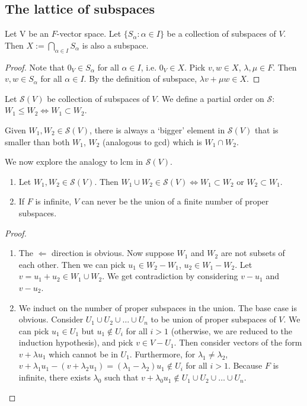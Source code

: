 \documentclass{scrartcl}
\def\le{\leqslant}
\begin{document}
\subsection{The lattice of subspaces}
\begin{proposition}
	Let V be an $F$-vector space. Let $\{S_\alpha: \alpha \in I\}$ be a collection of subspaces of $V$. Then $X := \bigcap_{\alpha \in I}S_\alpha$ is also a subspace.
\end{proposition}
\begin{proof}
	Note that $0_V \in S_\alpha$ for all $\alpha \in I$, i.e. $0_V \in X$. 
	Pick $v, w \in X$, $\lambda, \mu \in F$. Then $v, w \in S_\alpha$ for all $\alpha \in I$. By the definition of subspace, $\lambda v + \mu w \in X$. 
\end{proof}
Let $\mathcal{S}(V)$ be collection of subspaces of $V$. We define a partial order on $\mathcal{S}$: $W_1 \le W_2 \iff W_1 \subset W_2$. 
\begin{remark}
	Given $W_1, W_2 \in \mathcal{S}(V)$, there is always a `bigger' element in $\mathcal{S}(V)$ that is smaller than both $W_1$, $W_2$ (analogous to gcd) which is $W_1 \cap W_2$. 
\end{remark}
We now explore the analogy to lcm in $\mathcal{S}(V)$. 
\begin{proposition}
	\begin{enumerate}
		\item Let $W_1, W_2 \in \mathcal{S}(V)$. Then $W_1 \cup W_2 \in \mathcal{S}(V) \iff W_1 \subset W_2 \text{ or } W_2 \subset W_1$.
		\item If $F$ is infinite, $V$ can never be the union of a finite number of proper subspaces. 
	\end{enumerate}
\end{proposition}
\begin{proof}
	\begin{enumerate}
		\item The $\Leftarrow$ direction is obvious. Now suppose $W_1$ and $W_2$ are not subsets of each other. Then we can pick $u_1 \in W_2 - W_1$, $u_2 \in W_1 - W_2$. Let $v= u_1+u_2 \in W_1 \cup W_2$. We get contradiction by considering $v-u_1$ and $v-u_2$. 
		\item We induct on the number of proper subspaces in the union. The base case is obvious. 
		Consider $U_1 \cup U_2 \cup \dots \cup U_n$ to be union of proper subspaces of $V$. We can pick $u_1 \in U_1$ but $u_1 \notin U_i$ for all $i>1$ (otherwise, we are reduced to the induction hypothesis), and pick $v \in V - U_1$. Then consider vectors of the form $v + \lambda u_1$ which cannot be in $U_1$. Furthermore, for $\lambda_1 \ne \lambda_2$, $v + \lambda_1 u_1 - (v + \lambda_2 u_1) = (\lambda_1-\lambda_2)u_1 \notin U_i$ for all $i>1$. Because $F$ is infinite, there exists $\lambda_0$ such that $v + \lambda_0 u_1 \notin U_1 \cup U_2 \cup \dots \cup U_n$. 
	\end{enumerate}
\end{proof}
\end{document}
